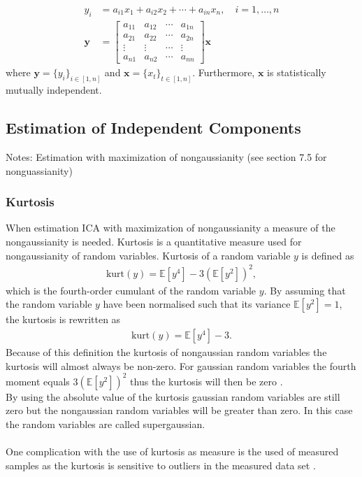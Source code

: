 \begin{align*}
y_i &= a_{i1} x_1 + a_{i2} x_2 + \cdots + a_{in} x_n, \quad i = 1, \dots, n \\
\mathbf{y} &= 
\begin{bmatrix}
a_{11} & a_{12} & \cdots & a_{1n} \\
a_{21} & a_{22} & \cdots & a_{2n} \\
\vdots & \vdots & \cdots & \vdots \\
a_{n1} & a_{n2} & \cdots & a_{nn}
\end{bmatrix}
\mathbf{x}
\end{align*}
where $\mathbf{y} = \{ y_i \}_{i \in [1,n]}$ and $\mathbf{x} = \{ x_t \}_{t \in [1,n]}$. Furthermore, $\mathbf{x}$ is statistically mutually independent.

\subsection{Estimation of Independent Components}
Notes:
Estimation with maximization of nongaussianity (see section 7.5 for nonguassianity)


\subsubsection{Kurtosis}
When estimation ICA with maximization of nongaussianity a measure of the nongaussianity is needed. Kurtosis is a quantitative measure used for nongaussianity of random variables. Kurtosis of a random variable $y$ is defined as
\begin{align*}
\text{kurt} (y) = \mathbb{E}[y^4] - 3 ( \mathbb{E}[y^2])^2,
\end{align*}
which is the fourth-order cumulant of the random variable $y$. By assuming that the random variable $y$ have been normalised such that its variance $\mathbb{E}[y^2] = 1$, the kurtosis is rewritten as
\begin{align*}
\text{kurt} (y) = \mathbb{E}[y^4] - 3.
\end{align*}
Because of this definition the kurtosis of nongaussian random variables the kurtosis will almost always be non-zero. For gaussian random variables the fourth moment equals $3(\mathbb{E}[y^2])^2$ thus the kurtosis will then be zero \cite[p. 171]{ICA}.
\\
By using the absolute value of the kurtosis gaussian random variables are still zero but the nongaussian random variables will be greater than zero. In this case the random variables are called supergaussian.
\\ \\
One complication with the use of kurtosis as measure is the used of measured samples as the kurtosis is sensitive to outliers in the measured data set \cite[p. 182]{ICA}. 
